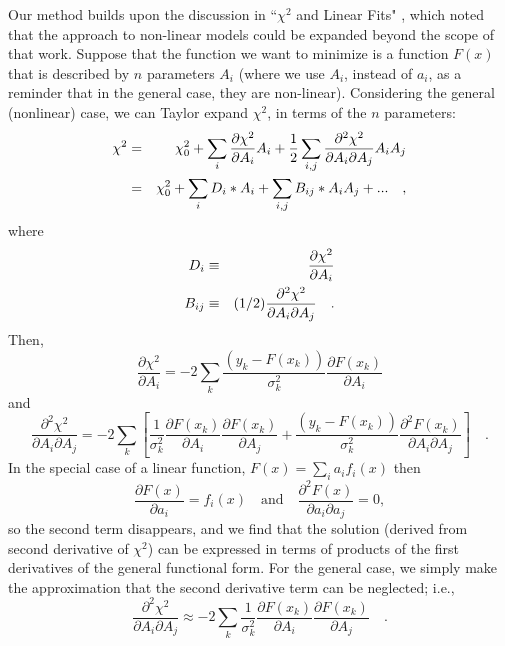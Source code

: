\documentclass[preprint]{aastex631}
\begin{document}
Our method builds upon the discussion in ``$\chi^2$ and Linear Fits" \citep{Gould03}, which noted that the approach to non-linear models could be expanded beyond the scope of that work. Suppose that the function we want to minimize is a function $F(x)$ that is described by $n$ parameters $A_i$ (where we use $A_i $, instead of $a_i$, as a reminder that in the general
case, they are non-linear). Considering
the general (nonlinear) case, we can Taylor expand $\chi^2$, in terms of the $n$ parameters:
\begin{eqnarray}
\chi^2 & = &  \chi^2_0 + \sum_i {\partial \chi^2\over \partial A_i} A_i
+ {1\over2}\sum_{i,j} {\partial^2 \chi^2\over \partial A_i \partial A_j}A_i A_j\\
& = & \chi^2_0 + \sum_i D_i * A_i + \sum_{i,j} B_{ij} * A_i A_j  + ... \quad,
\end{eqnarray}
where
\begin{eqnarray}
D_i  & \equiv & {\partial \chi^2\over \partial A_i} \label{eqn:d}\\
B_{ij} & \equiv & (1/2){\partial^2 \chi^2\over \partial A_i\partial A_j}  \quad. \label{eqn:b}
\end{eqnarray}
Then,
\begin{equation}
\frac{\partial \chi^2}{\partial A_i} = -2\sum_k \frac{(y_k - F(x_k))}{\sigma^2_k}\frac{\partial F(x_k)}{\partial A_i}
\end{equation}
and
\begin{equation}
\frac{\partial^2 \chi^2}{\partial A_i \partial A_j} = -2\sum_k \left[
 \frac{1}{\sigma^2_k}\frac{\partial F(x_k)}{\partial A_i}\frac{\partial F(x_k)}{\partial A_j} +
  \frac{(y_k - F(x_k))}{\sigma^2_k}\frac{\partial^2 F(x_k)}{\partial A_i \partial A_j}
 \right] \quad .
\end{equation}
In the special case of a linear function, $F(x) = \sum_i a_i f_i(x)$
then
\begin{equation}
\frac{\partial F(x)}{\partial a_i} = f_i(x)
\quad \mathrm{and} \quad
\frac{\partial^2 F(x)}{\partial a_i\partial a_j} = 0,
\end{equation}
so the second term disappears, and we find that the solution (derived from
second derivative of $\chi^2$) can be expressed
in terms of products of the first derivatives of the general functional
form.  For the general case, we simply make the approximation that the second derivative term can be neglected; i.e.,
\begin{equation}
\frac{\partial^2 \chi^2}{\partial A_i \partial A_j} \approx -2\sum_k 
 \frac{1}{\sigma^2_k}\frac{\partial F(x_k)}{\partial A_i}\frac{\partial F(x_k)}{\partial A_j} \quad.
\end{equation}
\end{document}
